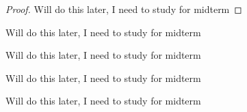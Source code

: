 \begin{proof}
    Will do this later, I need to study for midterm 
\end{proof}
\begin{example}[Intervals]
    Will do this later, I need to study for midterm 
\end{example}
\begin{example}[Points]
    Will do this later, I need to study for midterm 
\end{example}
\begin{example}
    Will do this later, I need to study for midterm 
\end{example}
\begin{example}
    Will do this later, I need to study for midterm 
\end{example}